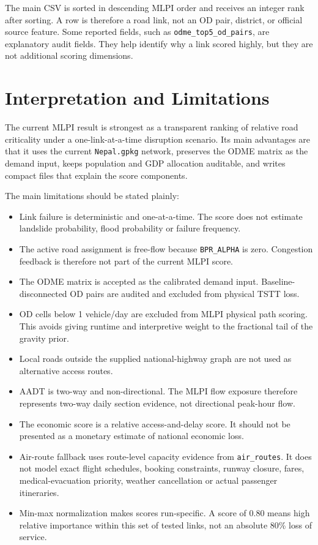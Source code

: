\documentclass[11pt,a4paper]{article}
\begin{document}
The main CSV is sorted in descending MLPI order and receives an integer rank
after sorting. A row is therefore a road link, not an OD pair, district, or
official source feature. Some reported fields, such as
\texttt{odme\_top5\_od\_pairs}, are explanatory audit fields. They help identify
why a link scored highly, but they are not additional scoring dimensions.

\section{Interpretation and Limitations}

The current MLPI result is strongest as a transparent ranking of relative road
criticality under a one-link-at-a-time disruption scenario. Its main advantages
are that it uses the current \texttt{Nepal.gpkg} network, preserves the ODME
matrix as the demand input, keeps population and GDP allocation auditable, and
writes compact files that explain the score components.

The main limitations should be stated plainly:

\begin{itemize}
    \item Link failure is deterministic and one-at-a-time. The score does not
    estimate landslide probability, flood probability or failure frequency.
    \item The active road assignment is free-flow because \texttt{BPR\_ALPHA}
    is zero. Congestion feedback is therefore not part of the current MLPI
    score.
    \item The ODME matrix is accepted as the calibrated demand input.
    Baseline-disconnected OD pairs are audited and excluded from physical
    TSTT loss.
    \item OD cells below 1 vehicle/day are excluded from MLPI physical path
    scoring. This avoids giving runtime and interpretive weight to the
    fractional tail of the gravity prior.
    \item Local roads outside the supplied national-highway graph are not used
    as alternative access routes.
    \item AADT is two-way and non-directional. The MLPI flow exposure therefore
    represents two-way daily section evidence, not directional peak-hour flow.
    \item The economic score is a relative access-and-delay score. It should
    not be presented as a monetary estimate of national economic loss.
    \item Air-route fallback uses route-level capacity evidence from
    \texttt{air\_routes}. It does not model exact flight schedules, booking
    constraints, runway closure, fares, medical-evacuation priority, weather
    cancellation or actual passenger itineraries.
    \item Min-max normalization makes scores run-specific. A score of 0.80
    means high relative importance within this set of tested links, not an
    absolute 80\% loss of service.
\end{itemize}
\end{document}
